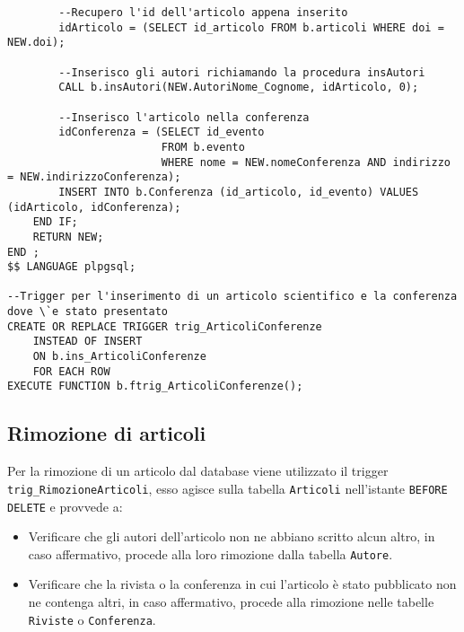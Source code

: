 \begin{lstlisting}
        --Recupero l'id dell'articolo appena inserito
        idArticolo = (SELECT id_articolo FROM b.articoli WHERE doi = NEW.doi);

        --Inserisco gli autori richiamando la procedura insAutori
        CALL b.insAutori(NEW.AutoriNome_Cognome, idArticolo, 0);

        --Inserisco l'articolo nella conferenza
        idConferenza = (SELECT id_evento
                        FROM b.evento
                        WHERE nome = NEW.nomeConferenza AND indirizzo = NEW.indirizzoConferenza);
        INSERT INTO b.Conferenza (id_articolo, id_evento) VALUES (idArticolo, idConferenza);
    END IF;
    RETURN NEW;
END ;
$$ LANGUAGE plpgsql;

--Trigger per l'inserimento di un articolo scientifico e la conferenza dove \`e stato presentato
CREATE OR REPLACE TRIGGER trig_ArticoliConferenze
    INSTEAD OF INSERT
    ON b.ins_ArticoliConferenze
    FOR EACH ROW
EXECUTE FUNCTION b.ftrig_ArticoliConferenze();
\end{lstlisting}

\subsection{Rimozione di articoli}

Per la rimozione di un articolo dal database viene utilizzato il trigger \texttt{trig\_RimozioneArticoli},
esso agisce sulla tabella \texttt{Articoli} nell'istante \texttt{BEFORE DELETE} e provvede a:
\begin{itemize}
    \item Verificare che gli autori dell'articolo non ne abbiano scritto alcun altro, in caso affermativo, procede
          alla loro rimozione dalla tabella \texttt{Autore}.
    \item Verificare che la rivista o la conferenza in cui l'articolo \`e stato pubblicato non ne contenga altri,
          in caso affermativo, procede alla rimozione nelle tabelle \texttt{Riviste} o \texttt{Conferenza}. 
\end{itemize}

